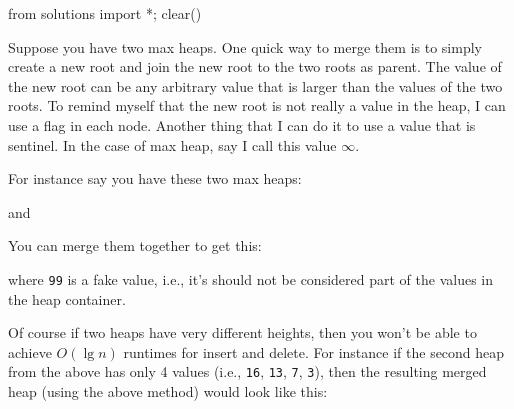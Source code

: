 \begin{python0}
from solutions import *; clear()
\end{python0}

Suppose you have two max heaps.
One quick way to merge them is to simply create a new root
and join the new root to the two roots as parent.
The value of the new root can be any arbitrary value that
is larger than the values of the two roots.
To remind myself that the new root is not really a value in the
heap, I can use a flag in each node.
Another thing that I can do it to use a value that is sentinel.
In the case of max heap, say I call this value $\infty$.

For instance say you have these two max heaps:


and




You can merge them together to get this:



where \verb!99! is a fake value, i.e.,
it's 
should not be considered part of the values in
the heap container.

Of course if two heaps have very different
heights, then you won't
be able to achieve
$O(\lg n)$ runtimes for insert and delete.
For instance if the second heap from the above
has only 4 values
(i.e., \verb!16!, \verb!13!, \verb!7!, \verb!3!),
then the resulting
merged heap (using the above method)
would look like this:


